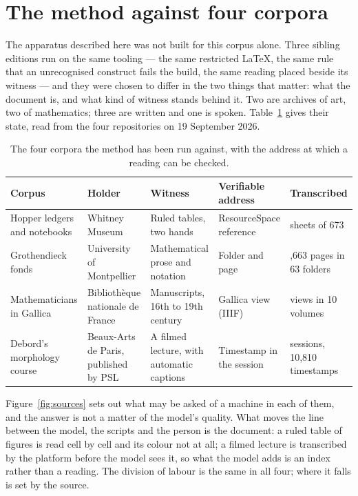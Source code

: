 \documentclass[11pt]{article}
\begin{document}
\section{The method against four corpora}

The apparatus described here was not built for this corpus alone. Three sibling
editions run on the same tooling — the same restricted LaTeX, the same rule that
an unrecognised construct fails the build, the same reading placed beside its
witness — and they were chosen to differ in the two things that matter: what the
document is, and what kind of witness stands behind it. Two are archives of art,
two of mathematics; three are written and one is spoken. Table~\ref{tab:corpora}
gives their state, read from the four repositories on 19 September 2026.

\begin{table}[htbp]\centering\small
\caption{The four corpora the method has been run against, with the address at
which a reading can be checked.}\label{tab:corpora}
\begin{tabular}{>{\raggedright\arraybackslash}p{2.45cm}>{\raggedright\arraybackslash}p{2.45cm}>{\raggedright\arraybackslash}p{2.75cm}>{\raggedright\arraybackslash}p{2.8cm}>{\raggedright\arraybackslash}p{2.7cm}}\toprule
Corpus & Holder & Witness & Verifiable address & Transcribed\\\midrule
Hopper ledgers and notebooks & Whitney Museum & Ruled tables, two hands & ResourceSpace reference & 667 sheets of 673\\
Grothendieck fonds & University of Montpellier & Mathematical prose and notation & Folder and page & 1,663 pages in 63 folders\\
Mathematicians in Gallica & Bibliothèque nationale de France & Manuscripts, 16th to 19th century & Gallica view (IIIF) & 549 views in 10 volumes\\
Debord's morphology course & Beaux-Arts de Paris, published by PSL & A filmed lecture, with automatic captions & Timestamp in the session & 45 sessions, 10,810 timestamps\\\bottomrule
\end{tabular}
\end{table}

Figure~\ref{fig:sources} sets out what may be asked of a machine in each of
them, and the answer is not a matter of the model's quality. What moves the
line between the model, the scripts and the person is the document: a ruled
table of figures is read cell by cell and its colour not at all; a filmed
lecture is transcribed by the platform before the model sees it, so what the
model adds is an index rather than a reading. The division of labour is the
same in all four; where it falls is set by the source.
\end{document}
